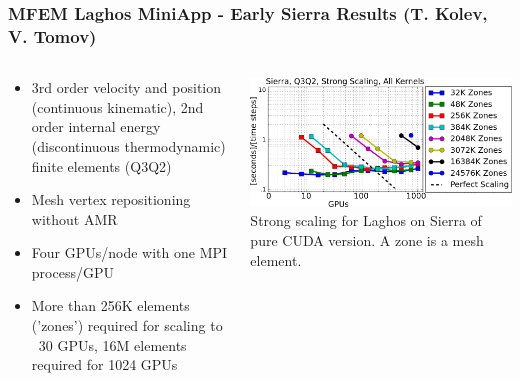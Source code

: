 \documentclass[aspectratio=169]{beamer}
\begin{document}
\begin{frame}
  \frametitle{MFEM Laghos MiniApp - Early Sierra Results (T. Kolev, V. Tomov)}
  \begin{columns}
    \begin{column}{0.5\textwidth}
      \begin{itemize}
        \item 3rd order velocity and position (continuous kinematic), 2nd order internal
          energy (discontinuous thermodynamic) finite elements (Q3Q2)
        \item Mesh vertex repositioning without AMR
        \item Four GPUs/node with one MPI process/GPU
        \item More than 256K elements ('zones') required for
          scaling to ~30 GPUs, 16M elements required for 1024 GPUs
      \end{itemize}
    \end{column}
    \begin{column}{0.5\textwidth}
      \includegraphics[width=\textwidth]{figures/laghos_strong_Q3Q2_sierra_cws.png} \\
      \small{Strong scaling for Laghos on Sierra of pure CUDA version.
      A zone is a mesh element.}
    \end{column}
  \end{columns}
\end{frame}
\end{document}
